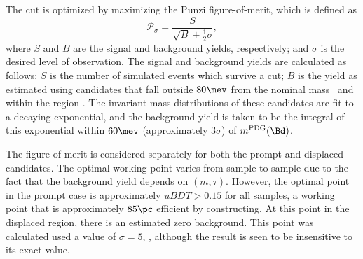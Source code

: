 %

The \uBDT cut is optimized  by maximizing
the Punzi figure-of-merit, which is defined as
\begin{equation}
  \mathcal{P}_\sigma = \frac{S}{\sqrt{B} + \tfrac12\sigma},
  \label{eq:db:punzi}
\end{equation}
where $S$ and $B$ are the signal and background yields, respectively; and $\sigma$ is the desired
level of observation.
The signal and background yields are calculated as follows:
$S$ is the number of simulated events which survive a \uBDT cut;
$B$ is the yield as estimated using \btokstrdb candidates
that fall outside $80\mev$ from the nominal \Bd mass~\cite{PDG2014} and within the region .
The invariant mass distributions of these candidates are fit to a decaying exponential,
and the background yield is taken to be the integral of this exponential within $60\mev$
(approximately $3\sigma$) of $m^\mathrm{PDG}(\Bd)$.

The figure-of-merit is considered separately for both the prompt and displaced candidates.
The optimal working point varies from sample to sample due to the fact that the background yield
depends on $(m,\tau)$.
However, the optimal point in the prompt case is approximately $uBDT>0.15$ for all samples, a
working point that
is approximately $85\pc$ efficient by constructing.
At this point in the displaced region, there is an estimated zero background.
This point was calculated used a value of $\sigma=5$, , although the result is seen
to be insensitive to its exact value.












